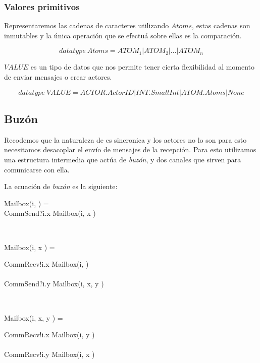 \subsubsection{Valores primitivos}

Representaremos las cadenas de caracteres utilizando $Atoms$, estas cadenas son inmutables y la única operación que se efectuá sobre ellas es la comparación.

\[
  datatype\ Atoms = ATOM_1 | ATOM_2 | \ldots | ATOM_n
\]

$VALUE$ es un tipo de datos que nos permite tener cierta flexibilidad al momento de enviar mensajes o crear actores. 

\[
  datatype\ VALUE = ACTOR.ActorID | INT.SmallInt | ATOM.Atoms | None
\]

\subsection{Buzón} 

Recodemos que la naturaleza de \CSP es sincronica y los actores no lo son para esto necesitamos desacoplar el envío de mensajes de la recepción. Para esto utilizamos una estructura intermedia que actúa de \textit{buzón}, y dos canales que sirven para comunicarse con ella.

La ecuación de \textit{buzón} es la siguiente:

\begin{process}
\begin{block}
Mailbox(i, \nil) = {} \\ \quad
CommSend?i.x \then Mailbox(i, \lseq x \rseq) 
\end{block} \\

\begin{block}
Mailbox(i, \lseq x \rseq) = {} \\ \quad 
  \begin{block}
    CommRecv!i.x \then Mailbox(i, \nil) \\
    \Extchoice \\
    CommSend?i.y \then Mailbox(i, \lseq x, y \rseq) 
  \end{block}
\end{block} \\

\begin{block}
Mailbox(i, \lseq x, y \rseq) = {} \\ \quad
  \begin{block}
    CommRecv!i.x \then Mailbox(i, \lseq y \rseq) \\
    \Extchoice \\
    CommRecv!i.y \then Mailbox(i, \lseq x \rseq) 
  \end{block} 
\end{block}

\end{process}

